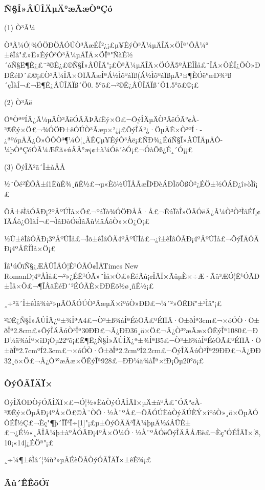 \subsubsection{Ñ§Î»ÂÛÎÄµÄ°æÃæÒªÇó}

(1) Ò³Ã¼

Ò³Ã¼Ó¦¾ÓÖÐÖÃÓÚÒ³ÃæÉÏ²¿¡£µ¥ÊýÒ³Ã¼µÄÎÄ×ÖÎª"ÕÂ¼°±êÌâ"£»Ë«ÊýÒ³Ò³Ã¼µÄÎÄ×ÖÎª"ÑàÉ½´óÑ§Ë¶Ê¿£¨²©Ê¿£©Ñ§Î»ÂÛÎÄ"¡£Ò³Ã¼µÄÎÄ×ÖÓÃ5ºÅËÎÌå£¨ÎÄ×ÖÉÏ¿ÕÒ»ÐÐÊéÐ´£©¡£Ò³Ã¼ÎÄ×ÖÏÂÃæÎªÁ½ÌõºáÏß(Á½ÌõºáÏßµÄ³¤¶ÈÓë°æÐ¾³ß´çÏàÍ¬£¬Ë¶Ê¿ÂÛÎÄÏß´Ö0. 5°õ£¬²©Ê¿ÂÛÎÄÏß´Ö1.5°õ£©¡£

(2) Ò³Âë

ÕªÒªºÍÄ¿Â¼µÄÒ³ÂëÓÃÂÞÂíÊý×Ö£¬ÕýÎÄµÄÒ³ÂëÓÃ°¢À­²®Êý×Ö£¬¾ÓÖÐ±êÓÚÒ³Ãæµ×²¿¡£ÕýÎÄ²¿·ÖµÄÊ×Ò³ºÍ·­¿ªºóµÄÃ¿Ò»ÓÒÒ³¶¼Ó¦¸ÃÊÇµ¥ÊýÒ³Âë¡£ÑÐ¾¿ÉúÑ§Î»ÂÛÎÄµÄÔ­¼þÒªÇóÓÃ¼ÆËã»úÅÅ°æ¡¢±à¼­Óë´òÓ¡£¬ÓàÕß¿É¸´Ó¡¡£

(3) ÕýÎÄ²ã´Î±àÅÅ

½¨Òé²ÉÓÃ±í1ËùÊ¾¸ñÊ½£¬µ«Èô½ÚÏÂÃæÎÞÐèÁÐÌõÕßÒ²¿ÉÖ±½ÓÁÐ¿î»òÏî¡£

ÕÂ±êÌâÓÃÐ¡2ºÅºÚÌå×Ö£¬ºáÏò¾ÓÖÐÅÅ·Å£¬ÊúÏòÎ»ÖÃÓëÄ¿Â¼Ò³Ò³ÌâÉÏ¡¢ÏÂÁô¿ÕÏàÍ¬£¬ÌâÐòÓëÌâÃû¼äÁôÒ»×Ö¿Õ¡£

½Ú±êÌâÓÃÐ¡3ºÅºÚÌå£¬Ìõ±êÌâÓÃ4ºÅºÚÌå£¬¿î±êÌâÓÃÐ¡4ºÅºÚÌå£¬ÕýÎÄÓÃÐ¡4ºÅËÎÌå×Ö¡£

Íâ¹úÓïÑ§¿ÆÂÛÎÄÓ¦Ê¹ÓÃÓ¢ÎÄTimes New RomanÐ¡4ºÅÌå£¬²»¿ÉÊ¹ÓÃ»¨Ìå×Ö£»ÊéÃû¡¢ÎÄÏ×ÃûµÈ×÷Æ·Ãû³ÆÓ¦Ê¹ÓÃÐ±Ìå×Ö£¬¶ÎÂäÊéÐ´²ÉÓÃÊ×ÐÐËõ½ø¸ñÊ½¡£

¸÷²ã´Î±êÌâ¾ù²»µÃÖÃÓÚÒ³ÃæµÄ×îºóÒ»ÐÐ£¬¼´²»ÔÊÐí"±³Ìâ"¡£

²©Ê¿Ñ§Î»ÂÛÎÄ¿ª±¾ÎªA4£¬Ò³±ß¾àÎªÉèÖÃ£ºÉÏÏÂ·Ö±ðÎª3cm£¬×óÓÒ·Ö±ðÎª2.8cm£»ÕýÎÄÂúÒ³Îª30ÐÐ£¬Ã¿ÐÐ36¸ö×Ö£¬Ã¿Ò³°æÃæ×ÖÊýÎª1080£¬ÐÐ¼ä¾àÎª×îÐ¡Öµ22°õ¡£Ë¶Ê¿Ñ§Î»ÂÛÎÄ¿ª±¾ÎªB5£¬Ò³±ß¾àÎªÉèÖÃ£ºÉÏÏÂ·Ö±ðÎª2.7cmºÍ2.3cm£¬×óÓÒ·Ö±ðÎª2.2cmºÍ2.2cm£¬ÕýÎÄÂúÒ³Îª29ÐÐ£¬Ã¿ÐÐ32¸ö×Ö£¬Ã¿Ò³°æÃæ×ÖÊýÎª928£¬ÐÐ¼ä¾àÎª×îÐ¡Öµ20°õ¡£

\subsubsection{ÒýÓÃÎÄÏ×}

ÕýÎÄÖÐÒýÓÃÎÄÏ×£¬Ó¦½«ËùÒýÓÃÎÄÏ×µÄ±àºÅ£¨ÓÃ°¢À­²®Êý×ÖµÄÐ¡4ºÅ×Ö£©À¨ÒÔ·½À¨ºÅ£¬ÖÃÓÚËùÒýÄÚÈÝ×îºóÒ»¸ö×ÖµÄÓÒÉÏ½Ç£¬Èç"¶þ´ÎÏ³Ï÷[1]"¡£µ±ÒýÓÃÄ³ÎÄ¼þµÄ½áÂÛÊ±£¬¿É½«¸ÃÎÄ¼þ±àºÅÓÃÐ¡4ºÅ×Ö¼Ó·½À¨ºÅÓëÕýÎÄÅÅÆë£¬Èç"ÓÉÎÄÏ×[8,10¡«14]¿ÉÖª"¡£

¸÷¼¶±êÌâ´¦¾ù²»µÃÉèÖÃÒýÓÃÎÄÏ×±êÊ¾¡£

\subsubsection{Ãû´ÊÊõÓï}

